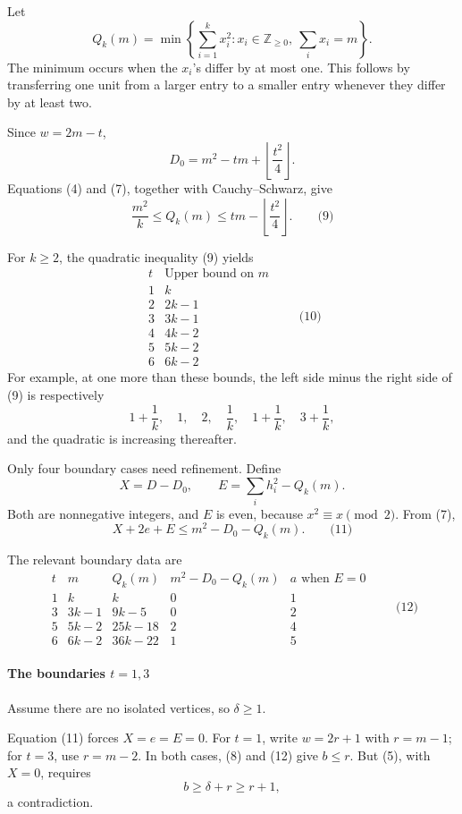 \documentclass[
  11pt,
  a4paper,
]{article}
\begin{document}
Let \[
Q_k(m)=
\min\left\{\sum_{i=1}^k x_i^2:
x_i\in\mathbb Z_{\ge0},\ \sum_i x_i=m\right\}.
\] The minimum occurs when the \(x_i\)'s differ by at most one. This
follows by transferring one unit from a larger entry to a smaller entry
whenever they differ by at least two.

Since \(w=2m-t\), \[
D_0=m^2-tm+\left\lfloor\frac{t^2}{4}\right\rfloor.
\] Equations (4) and (7), together with Cauchy--Schwarz, give \[
\frac{m^2}{k}\le Q_k(m)
\le tm-\left\lfloor\frac{t^2}{4}\right\rfloor. \qquad\text{(9)}
\]

For \(k\ge2\), the quadratic inequality (9) yields \[
\begin{array}{c|c}
t&\text{Upper bound on }m\\ \hline
1&k\\
2&2k-1\\
3&3k-1\\
4&4k-2\\
5&5k-2\\
6&6k-2
\end{array} \qquad\text{(10)}
\] For example, at one more than these bounds, the left side minus the
right side of (9) is respectively \[
1+\frac1k,\quad 1,\quad 2,\quad
\frac1k,\quad 1+\frac1k,\quad 3+\frac1k,
\] and the quadratic is increasing thereafter.

Only four boundary cases need refinement. Define \[
X=D-D_0,\qquad
E=\sum_i h_i^2-Q_k(m).
\] Both are nonnegative integers, and \(E\) is even, because
\(x^2\equiv x\pmod2\). From (7), \[
X+2e+E\le m^2-D_0-Q_k(m). \qquad\text{(11)}
\]

The relevant boundary data are \[
\begin{array}{c|c|c|c|c}
t&m&Q_k(m)&m^2-D_0-Q_k(m)&a\text{ when }E=0\\ \hline
1&k&k&0&1\\
3&3k-1&9k-5&0&2\\
5&5k-2&25k-18&2&4\\
6&6k-2&36k-22&1&5
\end{array} \qquad\text{(12)}
\]

\paragraph{\texorpdfstring{The boundaries
\(t=1,3\)}{The boundaries t=1,3}}\label{the-boundaries-t13}

Assume there are no isolated vertices, so \(\delta\ge1\).

Equation (11) forces \(X=e=E=0\). For \(t=1\), write \(w=2r+1\) with
\(r=m-1\); for \(t=3\), use \(r=m-2\). In both cases, (8) and (12) give
\(b\le r\). But (5), with \(X=0\), requires \[
b\ge\delta+r\ge r+1,
\] a contradiction.
\end{document}
